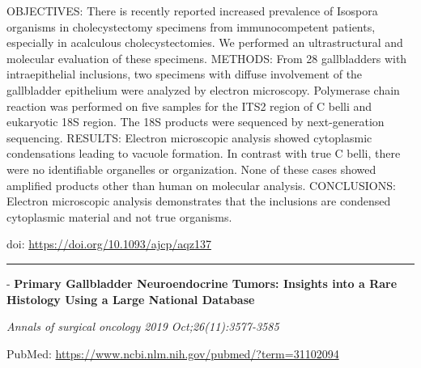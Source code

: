 \documentclass[
]{article}
\renewcommand{\linethickness}{0.05em}
\begin{document}
OBJECTIVES: There is recently reported increased prevalence of Isospora
organisms in cholecystectomy specimens from immunocompetent patients,
especially in acalculous cholecystectomies. We performed an
ultrastructural and molecular evaluation of these specimens. METHODS:
From 28 gallbladders with intraepithelial inclusions, two specimens with
diffuse involvement of the gallbladder epithelium were analyzed by
electron microscopy. Polymerase chain reaction was performed on five
samples for the ITS2 region of C belli and eukaryotic 18S region. The
18S products were sequenced by next-generation sequencing. RESULTS:
Electron microscopic analysis showed cytoplasmic condensations leading
to vacuole formation. In contrast with true C belli, there were no
identifiable organelles or organization. None of these cases showed
amplified products other than human on molecular analysis. CONCLUSIONS:
Electron microscopic analysis demonstrates that the inclusions are
condensed cytoplasmic material and not true organisms.

doi: \url{https://doi.org/10.1093/ajcp/aqz137}

\begin{center}\rule{0.5\linewidth}{\linethickness}\end{center}

- \textbf{Primary Gallbladder Neuroendocrine Tumors: Insights into a
Rare Histology Using a Large National Database}

\emph{Annals of surgical oncology 2019 Oct;26(11):3577-3585}

PubMed: \url{https://www.ncbi.nlm.nih.gov/pubmed/?term=31102094}
\end{document}
